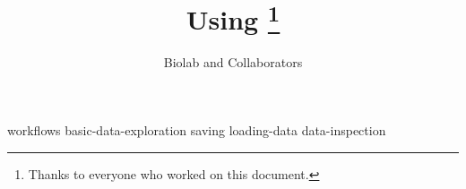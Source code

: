 \documentclass[symmetric, justified, a4paper]{tufte-book}
\title{Using \mutation\thanks{Thanks to everyone who worked on this document.}}
\author[Biolab and Collaborators]{Biolab and Collaborators}
\begin{document}
\frontmatter

\maketitle



\tableofcontents

%

\mainmatter



{workflows}
{basic-data-exploration}
{saving}
{loading-data}
{data-inspection}








\end{document}
